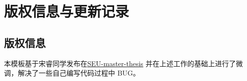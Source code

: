 \chapter{版权信息与更新记录}
\label{chp:version_license}

\section{版权信息}

本模板基于宋睿同学发布在\href{https://github.com/TouchFishPioneer/SEU-master-thesis}{SEU-master-thesis} 并在上述工作的基础上进行了微调，解决了一些自己编写代码过程中 BUG。